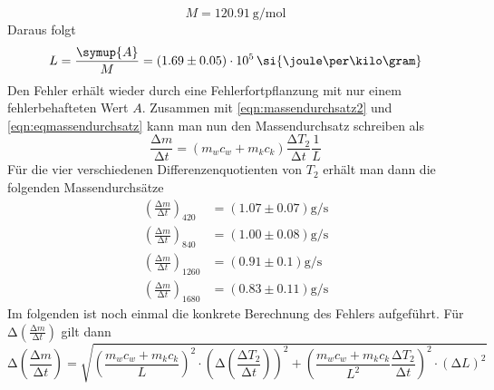 \begin{equation}
M = \SI{120.91}{\gram\per\mol}
\end{equation}
Daraus folgt
\begin{equation}
L = \frac{\symup{A}}{M} = (1.69 \pm 0.05) \cdot 10^{5} \, \si{\joule\per\kilo\gram}
\end{equation}
Den Fehler erhält wieder durch eine Fehlerfortpflanzung mit nur einem fehlerbehafteten Wert $A$.
Zusammen mit \eqref{eqn:massendurchsatz2} und \eqref{eqn:eqmassendurchsatz} kann man nun den Massendurchsatz schreiben als
\begin{equation}
\frac{\increment m}{\increment t} = (m_{w}c_{w} + m_{k}c_{k})\frac{\increment T_{2}}{\increment t} \frac{1}{L}
\end{equation}
Für die vier verschiedenen Differenzenquotienten von $T_{2}$ erhält man dann die folgenden Massendurchsätze
\begin{align}
\left( \frac{\increment m}{\increment t} \right)_{420} &= (1.07 \pm 0.07) \si{\gram\per\second} \\
\left( \frac{\increment m}{\increment t} \right)_{840} &= (1.00 \pm 0.08) \si{\gram\per\second} \\
\left( \frac{\increment m}{\increment t} \right)_{1260}&= (0.91 \pm 0.1) \si{\gram\per\second} \\
\left( \frac{\increment m}{\increment t} \right)_{1680}&= (0.83 \pm 0.11) \si{\gram\per\second} 
\end{align}
Im folgenden ist noch einmal die konkrete Berechnung des Fehlers aufgeführt.
Für $\increment \left( \frac{\increment m}{\increment t} \right) $ gilt dann
\begin{equation}
\increment \left(\frac{\increment m}{\increment t}\right) = \sqrt{\left( \frac{m_{w}c_{w} + m_{k}c_{k}}{L} \right)^{2} \cdot \left( \increment \left( \frac{\increment T_{2}}{\increment t}\right) \right)^2 +
\left( \frac{m_{w}c_{w} + m_{k}c_{k}}{L^{2}} \frac{\increment T_{2}}{\increment t}\right)^{2} \cdot (\increment L)^2}
\end{equation}
